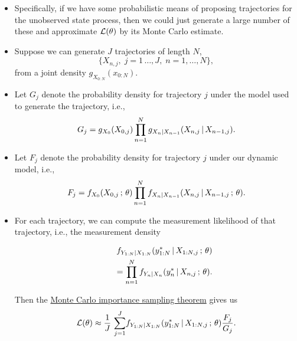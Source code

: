 \documentclass[]{article}
\begin{document}
\begin{itemize}
\item
  Specifically, if we have some probabilistic means of proposing
  trajectories for the unobserved state process, then we could just
  generate a large number of these and approximate \(\mathcal{L}(\theta)\) by
  its Monte Carlo estimate.
\item
  Suppose we can generate \(J\) trajectories of length \(N\),
  \[\big\{ X_{n,j}, \; j=1\,\dots,J,\;  n=1,\dots,N\big\},\] from a
  joint density \(g_{X_{0:N}}(x_{0:N})\).
\item
  Let \(G_j\) denote the probability density for trajectory \(j\) under
  the model used to generate the trajectory, i.e.,
  \[G_{j}= g_{X_0}(X_{0,j})\prod_{n=1}^N g_{X_n|X_{n-1}}(X_{n,j}{\, | \,} X_{n-1,j}).\]
\item
  Let \(F_j\) denote the probability density for trajectory \(j\) under
  our dynamic model, i.e.,
  \[F_{j}= f_{X_0}(X_{0,j}\, ; \,\theta)\prod_{n=1}^N f_{X_n|X_{n-1}}(X_{n,j}{\, | \,} X_{n-1,j}\, ; \,\theta).\]
\item
  For each trajectory, we can compute the measurement likelihood of that
  trajectory, i.e., the measurement density

  \begin{eqnarray} 
  &&f_{Y_{1:N}|X_{1:N}}(y_{1:N}^*{\, | \,} X_{1:N,j}\, ; \,\theta)
  \\
  &&\quad =\prod_{n=1}^{N} f_{Y_n|X_n}(y_n^*{\, | \,} X_{n,j}\, ; \,\theta).
  \end{eqnarray}

  Then the \href{monteCarlo.html\#importance-sampling}{Monte Carlo
  importance sampling theorem} gives us
  \[\mathcal{L}(\theta) \approx \frac{1}{J}\,\sum_{j=1}^{J}\!
  f_{Y_{1:N}|X_{1:N}}(y_{1:N}^*{\, | \,} X_{1:N,j}\, ; \,\theta)
  \frac{F_j}{G_j}.\]
  
  
  
  

\end{itemize}
\end{document}
